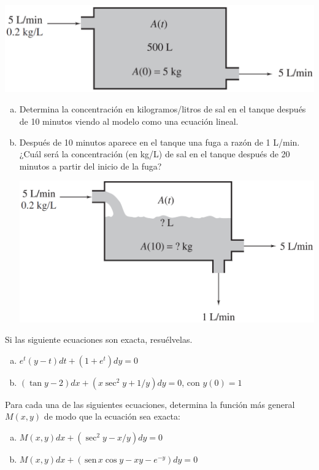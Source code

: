 \documentclass[12pt]{exam}
\renewcommand{\sin}{\,\text{sen}\,}
\begin{document}
\begin{questions}
\includegraphics[scale=.34]{F2T2.pdf}

\begin{enumerate}[a)]
	\item	Determina la concentración en kilogramos/litros de sal en el tanque después de 10 minutos viendo al modelo como una ecuación lineal.
    \item Después de 10 minutos aparece en el tanque una fuga a razón de 1 L/min. ¿Cuál será la concentración (en kg/L) de sal en el tanque después de 20 minutos a partir del inicio de la fuga?
    
    \includegraphics[scale=.34]{F3T2.pdf}
 \end{enumerate}


     \question
      Si las siguiente ecuaciones son exacta, resuélvelas.
      \begin{enumerate}[a)]
      	\item	$e^t(y-t)dt+(1+e^t)dy=0$
        \item	$(\tan y-2)dx+(x\sec^2y+1/y)dy=0$, con $y(0)=1$
      \end{enumerate}

     \question
     Para cada una de las siguientes ecuaciones, determina la función más general $M(x,y)$ de modo que la ecuación sea exacta:
     \begin{enumerate}[a)]
     	\item	$M(x,y)dx+(\sec^2y-x/y)dy=0$
        \item	$M(x,y)dx+(\sin x\cos y-xy-e^{-y})dy=0$
     \end{enumerate}

        \end{questions}
\end{document}
